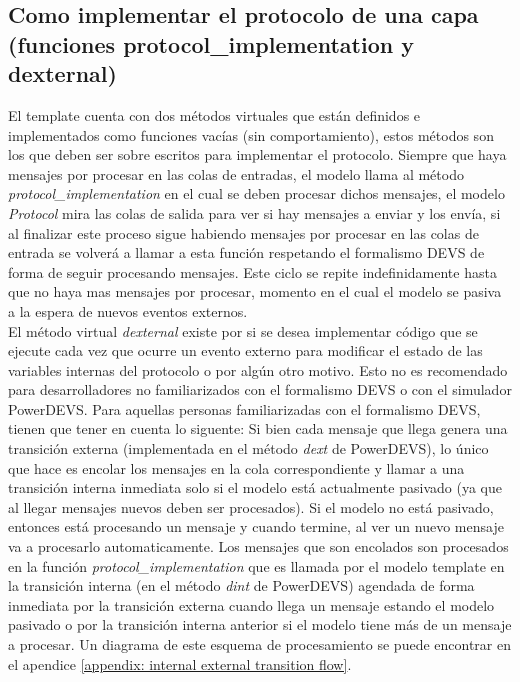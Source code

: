 \documentclass[10pt,a4paper]{article}
\begin{document}
\newpage

\subsection{Como implementar el protocolo de una capa (funciones protocol\_implementation y dexternal)}

El template cuenta con dos métodos virtuales que están definidos e implementados como funciones vacías (sin comportamiento), estos métodos son los que deben ser sobre escritos para implementar el protocolo. Siempre que haya mensajes por procesar en las colas de entradas, el modelo llama al método \textit{protocol\_implementation} en el cual se deben procesar dichos mensajes, el modelo \textit{Protocol} mira las colas de salida para ver si hay mensajes a enviar y los envía, si al finalizar este proceso sigue habiendo mensajes por procesar en las colas de entrada se volverá a llamar a esta función respetando el formalismo DEVS de forma de seguir procesando mensajes. Este ciclo se repite indefinidamente hasta que no haya mas mensajes por procesar, momento en el cual el modelo se pasiva a la espera de nuevos eventos externos. \\

El método virtual \textit{dexternal} existe por si se desea implementar código que se ejecute cada vez que ocurre un evento externo para modificar el estado de las variables internas del protocolo o por algún otro motivo. Esto no es recomendado para desarrolladores no familiarizados con el formalismo DEVS o con el simulador PowerDEVS. Para aquellas personas familiarizadas con el formalismo DEVS, tienen que tener en cuenta lo siguente: Si bien cada mensaje que llega genera una transición externa (implementada en el método \textit{dext} de PowerDEVS), lo único que hace es encolar los mensajes en la cola correspondiente y llamar a una transición interna inmediata solo si el modelo está actualmente pasivado (ya que al llegar mensajes nuevos deben ser procesados). Si el modelo no está pasivado, entonces está procesando un mensaje y cuando termine, al ver un nuevo mensaje va a procesarlo automaticamente. Los mensajes que son encolados son procesados en la función \textit{protocol\_implementation} que es llamada por el modelo template en la transición interna (en el método \textit{dint} de PowerDEVS) agendada de forma inmediata por la transición externa cuando llega un mensaje estando el modelo pasivado o por la transición interna anterior si el modelo tiene más de un mensaje a procesar. Un diagrama de este esquema de procesamiento se puede encontrar en el apendice \ref{appendix: internal external transition flow}.\\
\end{document}
